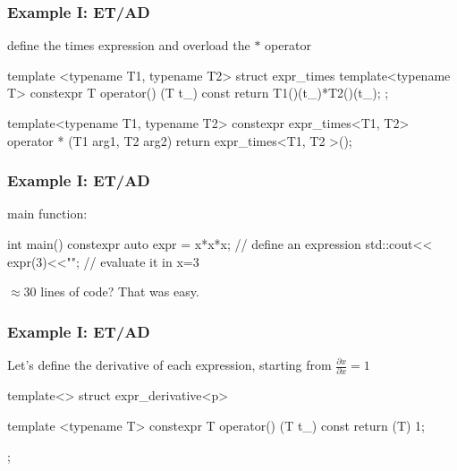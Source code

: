\documentclass[aspectratio=43]{beamer}
\begin{document}
\begin{frame}[fragile]\frametitle{Example I: ET/AD}
  define the times expression and overload the $*$ operator
\begin{Cpplisting}{}
template <typename T1, typename T2>
struct expr_times{
  template<typename T>
  constexpr T operator() (T t_) const{
    return T1()(t_)*T2()(t_);
  }
};

template<typename T1, typename T2>
constexpr expr_times<T1, T2>
operator * (T1 arg1, T2 arg2){
  return expr_times<T1, T2 >();}
\end{Cpplisting}
\end{frame}

\begin{frame}[fragile]\frametitle{Example I: ET/AD}
  main function:
  \begin{Cpplisting}[: main]{}
int main(){
  constexpr auto expr = x*x*x; // define an expression
  std::cout<< expr(3)<<"\n"; // evaluate it in x=3
}
  \end{Cpplisting}
  $\approx30$ lines of code?
  That was easy.
\end{frame}


\begin{frame}[fragile]\frametitle{Example I: ET/AD}
  Let's define the derivative of each expression, starting from $\frac{\partial x}{\partial x}=1$

  \begin{Cpplisting}[: Dp.cpp]{}
template<>
struct expr_derivative<p>{

  template <typename T>
  constexpr T operator() (T t_) const{
    return (T) 1;
  }
};
  \end{Cpplisting}
\end{frame}
\end{document}

